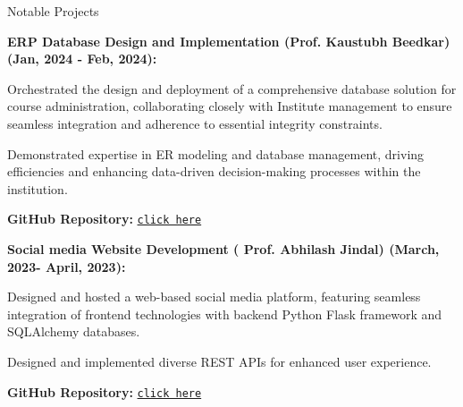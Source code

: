 \begin{rubric}{Notable Projects}

    \entry*
\textbf{ERP Database Design and Implementation (Prof. Kaustubh Beedkar) (Jan, 2024 - Feb, 2024):}\par
    Orchestrated the design and deployment of a comprehensive database solution for course administration, collaborating closely with Institute management to ensure seamless integration and adherence to essential integrity constraints.\par
    Demonstrated expertise in ER modeling and database management, driving efficiencies and enhancing data-driven decision-making processes within the institution.\par
    \textbf{GitHub Repository:} \href{https://github.com/suchith83/ERP-Database}{\texttt{click here}}


\entry*
\textbf{Social media Website Development ( Prof. Abhilash Jindal) (March, 2023- April, 2023):}\par
Designed and hosted a web-based social media platform, featuring seamless integration of frontend technologies with backend Python Flask framework and SQLAlchemy databases.\par
Designed and implemented diverse REST APIs for enhanced user experience.\par
\textbf{GitHub Repository:}
\href{https://github.com/suchith83/askmenow.git}{\texttt{click here}}


\end{rubric}
